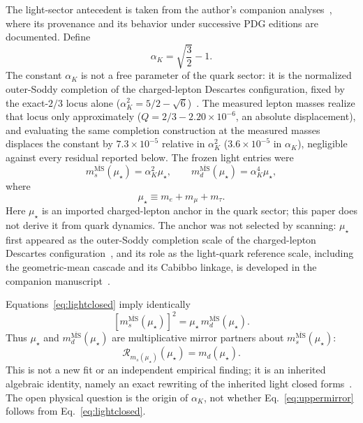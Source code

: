 \documentclass[aps,twocolumn,superscriptaddress,nofootinbib,floatfix]{revtex4-2}
\newcommand{\MSbar}{\overline{\mathrm{MS}}}
\newcommand{\mstar}{\mu_\star}
\newcommand{\alphaK}{\alpha_K}
\newcommand{\RR}{\mathcal R}
\begin{document}
The light-sector antecedent is taken from the author's companion analyses~\cite{BrilliantMPLA,BrilliantAPPB}, where its provenance and its behavior under successive PDG editions are documented. Define
\begin{equation}
\alphaK=\sqrt{\frac32}-1.
\label{eq:alpha}
\end{equation}
The constant $\alphaK$ is not a free parameter of the quark sector: it is the normalized outer-Soddy completion of the charged-lepton Descartes configuration, fixed by the exact-$2/3$ locus alone ($\alphaK^2=5/2-\sqrt6$)~\cite{BrilliantAPPB,BrilliantMPLA}. The measured lepton masses realize that locus only approximately ($Q=2/3-2.20\times10^{-6}$, an absolute displacement), and evaluating the same completion construction at the measured masses displaces the constant by $7.3\times10^{-5}$ relative in $\alphaK^2$ ($3.6\times10^{-5}$ in $\alphaK$), negligible against every residual reported below.
The frozen light entries were
\begin{equation}
m_s^{\MSbar}(\mstar)=\alphaK^2\mstar,
\qquad
m_d^{\MSbar}(\mstar)=\alphaK^4\mstar,
\label{eq:lightclosed}
\end{equation}
where
\begin{equation}
\mstar\equiv m_e+m_\mu+m_\tau.
\end{equation}
Here $\mstar$ is an imported charged-lepton anchor in the quark sector; this paper does not derive it from quark dynamics. The anchor was not selected by scanning: $\mstar$ first appeared as the outer-Soddy completion scale of the charged-lepton Descartes configuration~\cite{Kocik2012,BrilliantAPPB}, and its role as the light-quark reference scale, including the geometric-mean cascade and its Cabibbo linkage, is developed in the companion manuscript~\cite{BrilliantMPLA}.

Equations~\eqref{eq:lightclosed} imply identically
\begin{equation}
\boxed{[m_s^{\MSbar}(\mstar)]^2=\mstar\,m_d^{\MSbar}(\mstar).}
\label{eq:uppermirror}
\end{equation}
Thus $\mstar$ and $m_d^{\MSbar}(\mstar)$ are multiplicative mirror partners about $m_s^{\MSbar}(\mstar)$:
\begin{equation}
\boxed{\RR_{m_s(\mstar)}(\mstar)=m_d(\mstar).}
\label{eq:Rupper}
\end{equation}
This is not a new fit or an independent empirical finding; it is an inherited algebraic identity, namely an exact rewriting of the inherited light closed forms~\cite{BrilliantMPLA}. The open physical question is the origin of $\alphaK$, not whether Eq.~\eqref{eq:uppermirror} follows from Eq.~\eqref{eq:lightclosed}.
\end{document}
